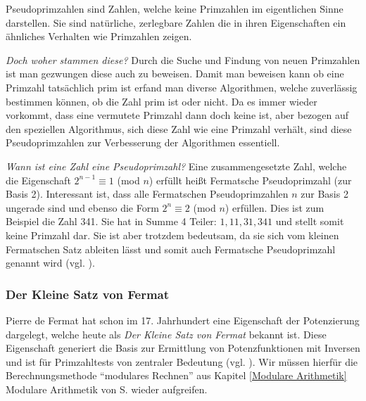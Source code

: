 \documentclass[12pt,a4paper]{article}
\theoremstyle{definition}
\begin{document}
Pseudoprimzahlen sind Zahlen, welche keine Primzahlen im eigentlichen Sinne darstellen.
Sie sind natürliche, zerlegbare Zahlen die in ihren Eigenschaften ein ähnliches Verhalten wie Primzahlen zeigen.

\textit{Doch woher stammen diese?}\newline
Durch die Suche und Findung von neuen Primzahlen ist man gezwungen diese auch zu beweisen.
Damit man beweisen kann ob eine Primzahl tatsächlich prim ist erfand man diverse Algorithmen, welche zuverlässig bestimmen können, ob die Zahl prim ist oder nicht.
Da es immer wieder vorkommt, dass eine vermutete Primzahl dann doch keine ist, aber bezogen auf den speziellen Algorithmus, sich diese Zahl wie eine Primzahl verhält, sind diese Pseudoprimzahlen zur Verbesserung der Algorithmen essentiell.

\textit{Wann ist eine Zahl eine Pseudoprimzahl?}\newline
Eine zusammengesetzte Zahl, welche die Eigenschaft $2^{n-1}\equiv 1$ (mod $n$) erfüllt heißt Fermatsche Pseudoprimzahl (zur Basis 2).
Interessant ist, dass alle Fermatschen Pseudoprimzahlen $n$ zur Basis 2 ungerade sind und ebenso die Form $2^n \equiv 2$ (mod $n$) erfüllen.
Dies ist zum Beispiel die Zahl 341.
Sie hat in Summe 4 Teiler: $1, 11, 31, 341$ und stellt somit keine Primzahl dar.
Sie ist aber trotzdem bedeutsam, da sie sich vom kleinen Fermatschen Satz ableiten lässt und somit auch Fermatsche Pseudoprimzahl genannt wird (vgl. \cite[91]{Ribenboim2006}).

\subsubsection{Der Kleine Satz von Fermat}\label{Der Kleine Satz von Fermat}
Pierre de Fermat hat schon im 17. Jahrhundert eine Eigenschaft der Potenzierung dargelegt, welche heute als \textit{Der Kleine Satz von Fermat} bekannt ist.
Diese Eigenschaft generiert die Basis zur Ermittlung von Potenzfunktionen mit Inversen und ist für Primzahltests von zentraler Bedeutung (vgl. \cite[303]{Meinel2015}).
Wir müssen hierfür die Berechnungsmethode “modulares Rechnen” aus Kapitel \ref{Modulare Arithmetik} Modulare Arithmetik von S. \pageref{Modulare Arithmetik} wieder aufgreifen.
\end{document}
